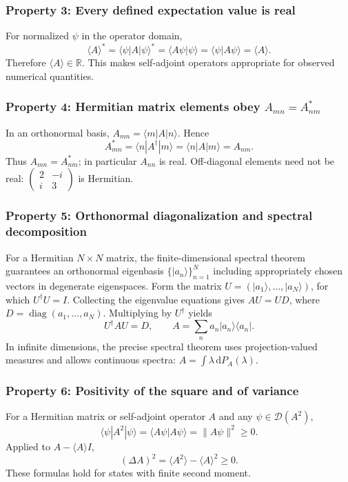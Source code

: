 \documentclass[11pt,a4paper]{article}
\newcommand{\dd}{\mathrm{d}}
\newcommand{\Dom}{\mathcal D}
\newcommand{\R}{\mathbb R}
\begin{document}
\subsubsection{Property 3: Every defined expectation value is real}
For normalized $\psi$ in the operator domain,
\begin{equation}
\langle A\rangle^*=\langle\psi|A|\psi\rangle^*
=\langle A\psi|\psi\rangle
=\langle\psi|A\psi\rangle=\langle A\rangle.
\end{equation}
Therefore $\boxed{\langle A\rangle\in\R}$. This makes self-adjoint operators appropriate for observed numerical quantities.

\subsubsection{Property 4: Hermitian matrix elements obey $A_{mn}=A_{nm}^*$}
In an orthonormal basis, $A_{mn}=\langle m|A|n\rangle$. Hence
\begin{equation}
A_{mn}^*=\langle n|A^\dagger|m\rangle
=\langle n|A|m\rangle=A_{nm}.
\end{equation}
Thus $\boxed{A_{mn}=A_{nm}^*}$; in particular $A_{nn}$ is real. Off-diagonal elements need not be real: $\left(\begin{smallmatrix}2&-i\\i&3\end{smallmatrix}\right)$ is Hermitian.

\subsubsection{Property 5: Orthonormal diagonalization and spectral decomposition}
For a Hermitian $N\times N$ matrix, the finite-dimensional spectral theorem guarantees an orthonormal eigenbasis $\{|a_n\rangle\}_{n=1}^N$ including appropriately chosen vectors in degenerate eigenspaces. Form the matrix $U=(|a_1\rangle,\ldots,|a_N\rangle)$, for which $U^\dagger U=I$. Collecting the eigenvalue equations gives $AU=UD$, where $D=\operatorname{diag}(a_1,\ldots,a_N)$. Multiplying by $U^\dagger$ yields
\begin{equation}
\boxed{U^\dagger A U=D},\qquad
\boxed{A=\sum_n a_n|a_n\rangle\langle a_n|}.
\end{equation}
In infinite dimensions, the precise spectral theorem uses projection-valued measures and allows continuous spectra: $A=\int\lambda\,\dd P_A(\lambda)$.

\subsubsection{Property 6: Positivity of the square and of variance}
For a Hermitian matrix or self-adjoint operator $A$ and any $\psi\in\Dom(A^2)$,
\begin{equation}
\boxed{\langle\psi|A^2|\psi\rangle=\langle A\psi|A\psi\rangle=\|A\psi\|^2\ge0}.
\end{equation}
Applied to $A-\langle A\rangle I$,
\begin{equation}
\boxed{(\Delta A)^2=\langle A^2\rangle-\langle A\rangle^2\ge0}.
\end{equation}
These formulas hold for states with finite second moment.
\end{document}
